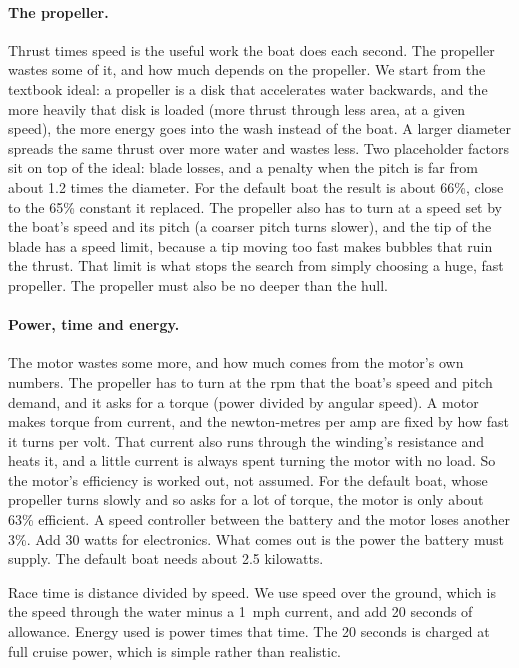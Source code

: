 \documentclass[11pt,a4paper]{article}
\renewcommand{\_}{\textunderscore\allowbreak}
\begin{document}
\paragraph{The propeller.} Thrust times speed is the useful work the boat does each second. The propeller wastes some of it, and how much depends on the propeller. We start from the textbook ideal: a propeller is a disk that
accelerates water backwards, and the more heavily that disk is loaded (more thrust through less area, at a given speed), the more energy goes into the wash instead of the boat. A larger diameter spreads the same thrust over more water and wastes less.
Two placeholder factors sit on top of the ideal: blade losses, and a penalty when the pitch is far from about 1.2 times the diameter. For the default boat the result is about 66\%, close to the 65\% constant it replaced.
The propeller also has to turn at a speed set by the boat's speed and its pitch (a coarser pitch turns slower), and the tip of the blade has a speed limit, because a tip moving too fast makes bubbles that ruin the thrust.
That limit is what stops the search from simply choosing a huge, fast propeller. The propeller must also be no deeper than the hull.

\paragraph{Power, time and energy.} The motor wastes some more, and how much comes from the motor's own numbers. The propeller has to turn at the rpm that the boat's speed and pitch demand, and it asks for a torque (power divided by angular speed). A motor makes torque from current, and the newton-metres per amp are fixed by how fast it turns per volt. That current also runs through the winding's resistance and heats it, and a little current is always spent turning the motor with no load. So the motor's efficiency is worked out, not assumed. For the default boat, whose propeller turns slowly and so asks for a lot of torque, the motor is only about 63\% efficient. A speed controller between the battery and the motor loses another 3\%.
Add 30 watts for electronics. What comes out is the power the battery must supply. The default boat needs about 2.5 kilowatts.

Race time is distance divided by speed. We use speed over the ground, which is the speed through the water minus a 1~mph current, and add 20 seconds of allowance. Energy used is power times that time.
The 20 seconds is charged at full cruise power, which is simple rather than realistic.
\end{document}
